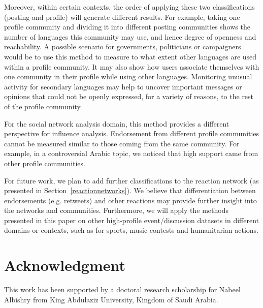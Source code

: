 \documentclass[conference]{IEEEtran}
\begin{document}
Moreover, within certain contexts, the order of applying these two
classifications (posting and profile) will generate different results.
For example, taking one profile community and dividing it into
different posting communities shows the number of languages this
community may use, and hence degree of openness and reachability. A
possible scenario for governments, politicians or campaigners would be
to use this method to measure to what extent other languages are used
within a profile community. It may also show how users associate
themselves with one community in their profile while using other
languages. Monitoring unusual activity for secondary languages may
help to uncover important messages or opinions that could not be
openly expressed, for a variety of reasons, to the rest of the profile
community.

For the social network analysis domain, this method provides a
different perspective for influence analysis. Endorsement from
different profile communities cannot be measured similar to those
coming from the same community. For example, in a controversial Arabic
topic, we noticed that high support came from other profile
communities.

For future work, we plan to add further classifications to the
reaction network (as presented in Section~\ref{reactionnetworks}). We
believe that differentiation between endorsements (e.g. retweets) and other
reactions may provide further insight into the networks and
communities. Furthermore, we will apply the methods presented in this
paper on other high-profile event/discussion datasets in different
domains or contexts, such as for sports, music contests and
humanitarian actions.


\section*{Acknowledgment}

This work has been supported by a doctoral research scholarship for
Nabeel Albishry from King Abdulaziz University, Kingdom of Saudi
Arabia.







\end{document}
